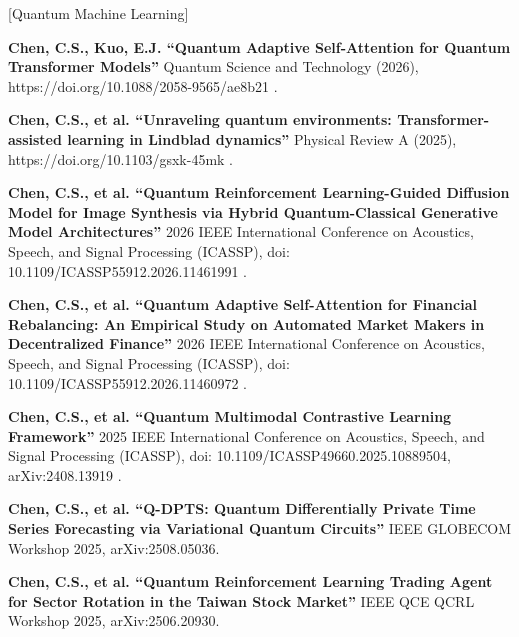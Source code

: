 \documentclass[letterpaper,10pt]{article}
\newcommand{\resumeSubHeadingListStart}{\begin{itemize}[leftmargin=0.15in, label={}]}
\newcommand{\resumeSubHeadingListEnd}{\end{itemize}}
\begin{document}
   [Quantum Machine Learning]
  \resumeSubHeadingListStart
    \small{\item{

    \textbf{Chen, C.S., Kuo, E.J. ``Quantum Adaptive Self-Attention for Quantum Transformer Models''}{ Quantum Science and Technology (2026), https://doi.org/10.1088/2058-9565/ae8b21 .} \\ \vspace{1pt}

    \textbf{Chen, C.S., et al. ``Unraveling quantum environments: Transformer-assisted learning in Lindblad dynamics''}{ Physical Review A (2025), https://doi.org/10.1103/gsxk-45mk .} \\ \vspace{1pt}

    \textbf{Chen, C.S., et al. ``Quantum Reinforcement Learning-Guided Diffusion Model for Image Synthesis via Hybrid Quantum-Classical Generative Model Architectures''}{ 2026 IEEE International Conference on Acoustics, Speech, and Signal Processing (ICASSP), doi: 10.1109/ICASSP55912.2026.11461991 .} \\ \vspace{1pt}

    \textbf{Chen, C.S., et al. ``Quantum Adaptive Self-Attention for Financial Rebalancing: An Empirical Study on Automated Market Makers in Decentralized Finance''}{ 2026 IEEE International Conference on Acoustics, Speech, and Signal Processing (ICASSP), doi: 10.1109/ICASSP55912.2026.11460972 .} \\ \vspace{1pt}

    \textbf{Chen, C.S., et al. ``Quantum Multimodal Contrastive Learning Framework''}{ 2025 IEEE International Conference on Acoustics, Speech, and Signal Processing (ICASSP), doi: 10.1109/ICASSP49660.2025.10889504, arXiv:2408.13919 .} \\ \vspace{1pt}

    \textbf{Chen, C.S., et al. ``Q-DPTS: Quantum Differentially Private Time Series Forecasting via Variational Quantum Circuits''}{ IEEE GLOBECOM Workshop 2025, arXiv:2508.05036.} \\ \vspace{1pt}

    \textbf{Chen, C.S., et al. ``Quantum Reinforcement Learning Trading Agent for Sector Rotation in the Taiwan Stock Market''}{ IEEE QCE QCRL Workshop 2025, arXiv:2506.20930.} \\ \vspace{1pt}

    }}
  \resumeSubHeadingListEnd
\end{document}
